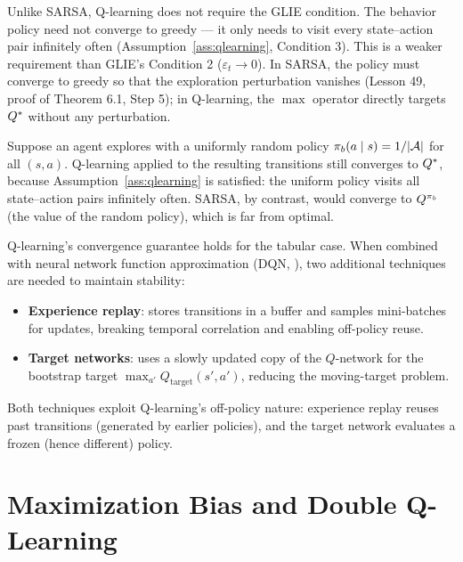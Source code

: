 \documentclass[11pt,a4paper]{article}
\begin{document}
\begin{remark}
\label{rem:no_glie}
Unlike SARSA, Q-learning does not require the GLIE condition.
The behavior policy need not converge to greedy --- it only needs
to visit every state--action pair infinitely often
(Assumption~\ref{ass:qlearning}, Condition 3). This is a weaker
requirement than GLIE's Condition 2
($\varepsilon_t \to 0$). In SARSA, the policy must converge to
greedy so that the exploration perturbation vanishes
(Lesson 49, proof of Theorem 6.1, Step 5); in Q-learning, the
$\max$ operator directly targets $Q^*$ without any
perturbation.
\end{remark}

\begin{example}
\label{ex:off_policy}
Suppose an agent explores with a uniformly random policy
$\pi_b(a \mid s) = 1/|\mathcal{A}|$ for all $(s,a)$. Q-learning
applied to the resulting transitions still converges to $Q^*$,
because Assumption~\ref{ass:qlearning} is satisfied: the uniform
policy visits all state--action pairs infinitely often. SARSA, by
contrast, would converge to $Q^{\pi_b}$ (the value of the
random policy), which is far from optimal.
\end{example}

\begin{rlconnection}[title={From Q-Learning to DQN}]
Q-learning's convergence guarantee holds for the tabular case.
When combined with neural network function approximation
(DQN, \citet[Chapter 16]{suttonbarto2018}), two additional
techniques are needed to maintain stability:
\begin{itemize}[nosep]
  \item \textbf{Experience replay}: stores transitions in a buffer
    and samples mini-batches for updates, breaking temporal
    correlation and enabling off-policy reuse.
  \item \textbf{Target networks}: uses a slowly updated copy of the
    $Q$-network for the bootstrap target
    $\max_{a'} Q_{\text{target}}(s', a')$, reducing the moving-target
    problem.
\end{itemize}
Both techniques exploit Q-learning's off-policy nature: experience
replay reuses past transitions (generated by earlier policies), and
the target network evaluates a frozen (hence different) policy.
\end{rlconnection}

\section{Maximization Bias and Double Q-Learning}
\label{sec:max_bias}
\end{document}
